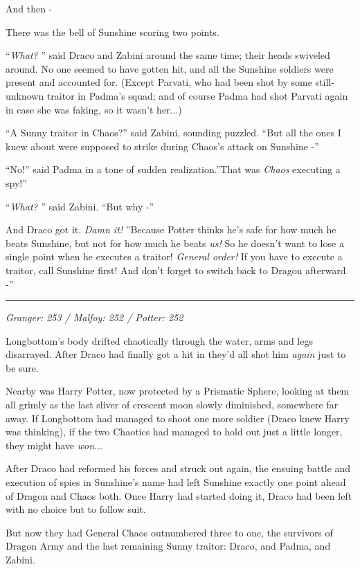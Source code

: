 And then -

There was the bell of Sunshine scoring two points.

``\emph{What?} '' said Draco and Zabini around the same time; their heads
swiveled around. No one seemed to have gotten hit, and all the Sunshine
soldiers were present and accounted for. (Except Parvati, who had been
shot by some still-unknown traitor in Padma's squad; and of course Padma
had shot Parvati again in case she was faking, so it wasn't her...)

``A Sunny traitor in Chaos?'' said Zabini, sounding puzzled. ``But all
the ones I knew about were supposed to strike during Chaos's attack on
Sunshine -''

``No!'' said Padma in a tone of sudden realization.''That was
\emph{Chaos} executing a spy!''

``\emph{What?} '' said Zabini. ``But why -''

And Draco got it. \emph{Damn it!} ''Because Potter thinks he's safe for
how much he beats Sunshine, but not for how much he beats \emph{us!} So
he doesn't want to lose a single point when he executes a traitor!
\emph{General order!} If you have to execute a traitor, call Sunshine
first! And don't forget to switch back to Dragon afterward -''

\begin{center}\rule{3in}{0.4pt}\end{center}

\emph{Granger: 253 / Malfoy: 252 / Potter: 252}

Longbottom's body drifted chaotically through the water, arms and legs
disarrayed. After Draco had finally got a hit in they'd all shot him
\emph{again} just to be sure.

Nearby was Harry Potter, now protected by a Prismatic Sphere, looking at
them all grimly as the last sliver of crescent moon slowly diminished,
somewhere far away. If Longbottom had managed to shoot one more soldier
(Draco knew Harry was thinking), if the two Chaotics had managed to hold
out just a little longer, they might have \emph{won}...

After Draco had reformed his forces and struck out again, the ensuing
battle and execution of spies in Sunshine's name had left Sunshine
exactly one point ahead of Dragon and Chaos both. Once Harry had started
doing it, Draco had been left with no choice but to follow suit.

But now they had General Chaos outnumbered three to one, the survivors
of Dragon Army and the last remaining Sunny traitor: Draco, and Padma,
and Zabini.

